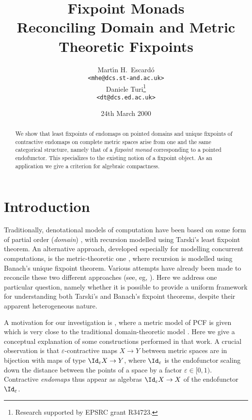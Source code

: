 \documentclass[11pt,a4paper]{article}
\title{{\Large\bf Fixpoint Monads}
\\
{\large\bf Reconciling Domain and Metric Theoretic Fixpoints}
}
\date{24th March 2000}
\author{
\begin{tabular}{c}
Mart\'{\i}n H.\ Escard\'{o}\\
{\tt <mhe@dcs.st-and.ac.uk>}
\end{tabular}
\hspace{7mm}
\begin{tabular}{c}
Daniele Turi\thanks{Research supported by EPSRC grant R34723.}
\\
{\tt <dt@dcs.ed.ac.uk>}
\end{tabular}
}
\begin{document}
\maketitle


\begin{abstract}
\noindent
We show that least fixpoints of endomaps on pointed domains
and unique fixpoints of contractive endomaps on complete metric spaces
arise from one and the same categorical structure,
namely that of a \emph{fixpoint monad} corresponding to 
a pointed endofunctor.
This specializes to the existing notion of a fixpoint object.
As an application we give a criterion for algebraic compactness.
\end{abstract}


\section{Introduction}

Traditionally,
denotational models of computation have been
based on some form of partial order (\emph{domain}) \cite{domains},
with recursion modelled using Tarski's
least fixpoint theorem.
An alternative approach,
developed especially for modelling concurrent computations,
is the metric-theoretic one \cite{ACG},
where recursion is modelled using Banach's unique
fixpoint theorem.
Various attempts have already been made to reconcile these
two different approaches (see, eg, \cite{Smyth,Wagner}).
Here we address one particular question,
namely whether it is possible to provide
a uniform framework for understanding
both Tarski's and Banach's fixpoint theorems,
despite their apparent heterogeneous nature.

A motivation for our investigation
is \cite{escardo:metric}, where
a metric model of PCF is given
which is very close to the traditional
domain-theoretic model \cite{Scott}.
Here we give a conceptual explanation
of some constructions performed in that work.
A crucial observation is 
that $\varepsilon$-contractive maps
$X\rightarrow Y$
between metric spaces 
are in bijection with 
maps of type $\Id_\varepsilon X \rightarrow Y$,
where $\Id_\varepsilon$ is the endofunctor
scaling down the distance
between the points of a space by a factor $\varepsilon \in [0,1)$.
Contractive \emph{endomaps} thus appear as algebras 
$\Id_\varepsilon X \rightarrow X$
of the endofunctor $\Id_\varepsilon$.

\end{document}

